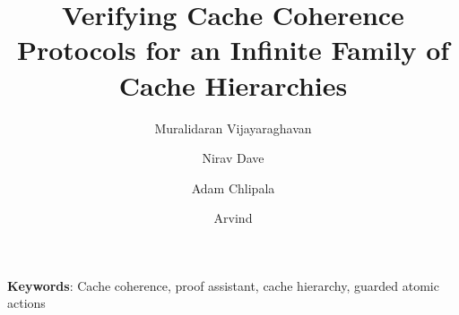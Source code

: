 
\title{Verifying Cache Coherence Protocols for an Infinite Family of Cache Hierarchies}





\author{Muralidaran Vijayaraghavan \and Nirav Dave \and Adam Chlipala \and Arvind}


\date{}

\maketitle %


\begin{abstract}

\end{abstract}


\centerline{\footnotesize {\bf Keywords}: Cache coherence, proof assistant, cache hierarchy, guarded atomic actions}



